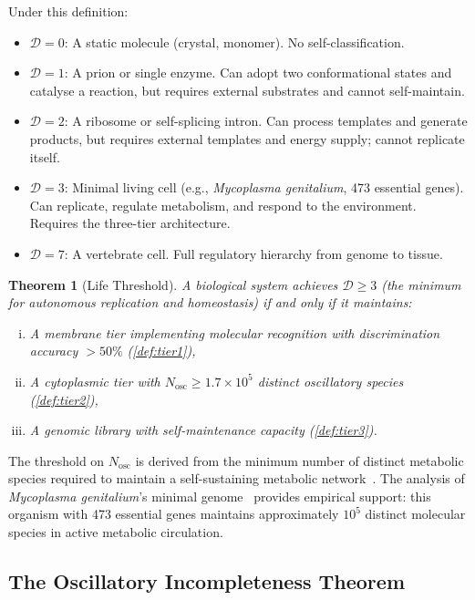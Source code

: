 \documentclass[12pt,a4paper]{article}
\newtheorem{theorem}{Theorem}[section]
\theoremstyle{definition}
\theoremstyle{remark}
\newcommand{\Nosc}{N_{\mathrm{osc}}}
\newcommand{\Dcat}{\mathcal{D}}
\begin{document}
Under this definition:
\begin{itemize}
  \item $\Dcat = 0$: A static molecule (crystal, monomer). No self-classification.
  \item $\Dcat = 1$: A prion or single enzyme. Can adopt two conformational states and catalyse a reaction, but requires external substrates and cannot self-maintain.
  \item $\Dcat = 2$: A ribosome or self-splicing intron. Can process templates and generate products, but requires external templates and energy supply; cannot replicate itself.
  \item $\Dcat = 3$: Minimal living cell (e.g., \textit{Mycoplasma genitalium}, 473 essential genes). Can replicate, regulate metabolism, and respond to the environment. Requires the three-tier architecture.
  \item $\Dcat = 7$: A vertebrate cell. Full regulatory hierarchy from genome to tissue.
\end{itemize}

\begin{theorem}[Life Threshold]
\label{thm:life_threshold}
A biological system achieves $\Dcat \geq 3$ (the minimum for autonomous replication and homeostasis) if and only if it maintains:
\begin{enumerate}[(i)]
  \item A membrane tier implementing molecular recognition with discrimination accuracy $>50\%$ (\cref{def:tier1}),
  \item A cytoplasmic tier with $\Nosc \geq 1.7 \times 10^5$ distinct oscillatory species (\cref{def:tier2}),
  \item A genomic library with self-maintenance capacity (\cref{def:tier3}).
\end{enumerate}
\end{theorem}

The threshold on $\Nosc$ is derived from the minimum number of distinct metabolic species required to maintain a self-sustaining metabolic network~\cite{Kauffman1986}. The analysis of \textit{Mycoplasma genitalium}'s minimal genome~\cite{Glass2006} provides empirical support: this organism with 473 essential genes maintains approximately $10^5$ distinct molecular species in active metabolic circulation.

\subsection{The Oscillatory Incompleteness Theorem}
\end{document}
